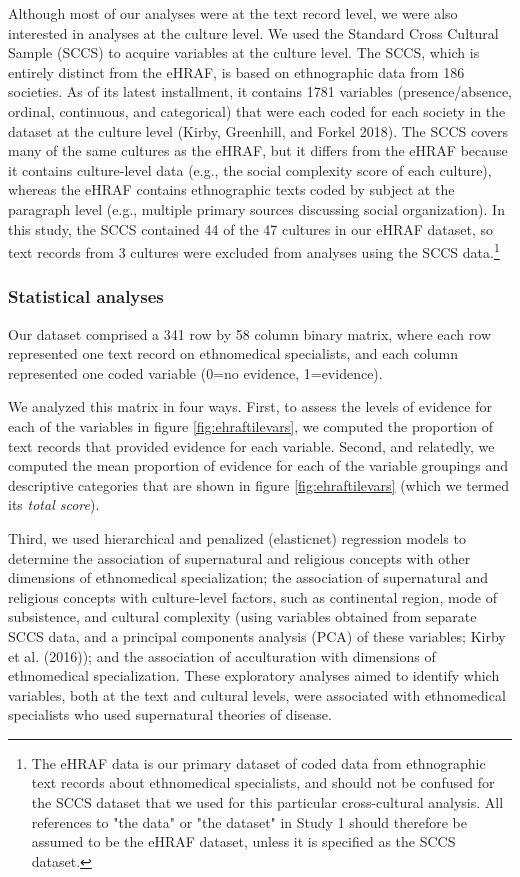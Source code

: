 \documentclass[
  11pt,
]{article}
\begin{document}
Although most of our analyses were at the text record level, we were also interested in analyses at the culture level. We used the Standard Cross Cultural Sample (SCCS) to acquire variables at the culture level. The SCCS, which is entirely distinct from the eHRAF, is based on ethnographic data from 186 societies. As of its latest installment, it contains 1781 variables (presence/absence, ordinal, continuous, and categorical) that were each coded for each society in the dataset at the culture level (Kirby, Greenhill, and Forkel 2018). The SCCS covers many of the same cultures as the eHRAF, but it differs from the eHRAF because it contains culture-level data (e.g., the social complexity score of each culture), whereas the eHRAF contains ethnographic texts coded by subject at the paragraph level (e.g., multiple primary sources discussing social organization). In this study, the SCCS contained 44 of the 47 cultures in our eHRAF dataset, so text records from 3 cultures were excluded from analyses using the SCCS data.\footnote{The eHRAF data is our primary dataset of coded data from ethnographic text records about ethnomedical specialists, and should not be confused for the SCCS dataset that we used for this particular cross-cultural analysis. All references to "the data" or "the dataset" in Study 1 should therefore be assumed to be the eHRAF dataset, unless it is specified as the SCCS dataset.}

\hypertarget{statistical-analyses}{%
\subsubsection{Statistical analyses}\label{statistical-analyses}}

Our dataset comprised a 341 row by 58 column binary matrix, where each row represented one text record on ethnomedical specialists, and each column represented one coded variable (0=no evidence, 1=evidence).

We analyzed this matrix in four ways. First, to assess the levels of evidence for each of the variables in figure \ref{fig:ehraftilevars}, we computed the proportion of text records that provided evidence for each variable. Second, and relatedly, we computed the mean proportion of evidence for each of the variable groupings and descriptive categories that are shown in figure \ref{fig:ehraftilevars} (which we termed its \emph{total score}).

Third, we used hierarchical and penalized (elasticnet) regression models to determine the association of supernatural and religious concepts with other dimensions of ethnomedical specialization; the association of supernatural and religious concepts with culture-level factors, such as continental region, mode of subsistence, and cultural complexity (using variables obtained from separate SCCS data, and a principal components analysis (PCA) of these variables; Kirby et al. (2016)); and the association of acculturation with dimensions of ethnomedical specialization. These exploratory analyses aimed to identify which variables, both at the text and cultural levels, were associated with ethnomedical specialists who used supernatural theories of disease.
\end{document}
